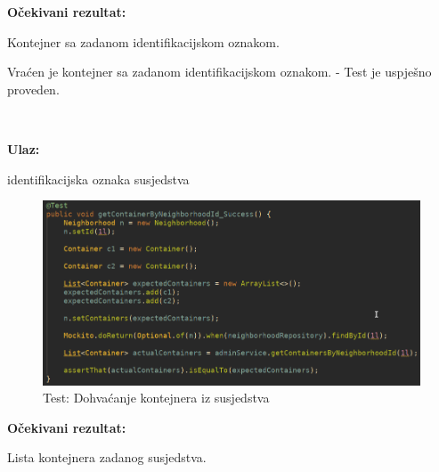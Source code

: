 			\noindent \textbf{Očekivani rezultat:}
				\begin{packed_enum}
				\item Kontejner sa zadanom identifikacijskom oznakom.
							
				
			\end{packed_enum}
			
		
			 Vraćen je kontejner sa zadanom identifikacijskom oznakom. - Test je uspješno proveden.			


			
			
			\noindent {}
			
			\
			
			\noindent \textbf{Ulaz:}
			
			\begin{packed_enum}
				\item identifikacijska oznaka susjedstva
					
				
			\end{packed_enum}

			\begin{figure}[H]
					\includegraphics[scale=0.57]{figures/Screenshot_20200115_224048.PNG}
					\centering
					\caption{Test: Dohvaćanje kontejnera iz susjedstva}
					\label{fig:Dohvaćanje kontejnera iz susjedstva}
				\end{figure}	
			
			\noindent \textbf{Očekivani rezultat:}
				\begin{packed_enum}
				\item Lista kontejnera zadanog susjedstva.
							
				
			\end{packed_enum}
			
		
